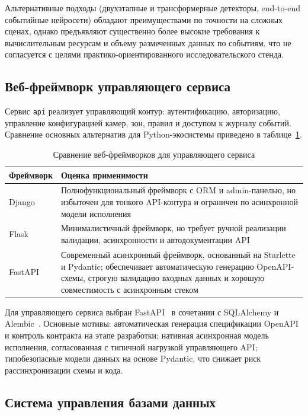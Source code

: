 Альтернативные подходы (двухэтапные и трансформерные детекторы, end-to-end событийные нейросети) обладают преимуществами по точности на сложных сценах, однако предъявляют существенно более высокие требования к вычислительным ресурсам и объему размеченных данных по событиям, что не согласуется с целями практико-ориентированного исследовательского стенда.

\subsection{Веб-фреймворк управляющего сервиса}

Сервис \texttt{api} реализует управляющий контур: аутентификацию, авторизацию, управление конфигурацией камер, зон, правил и доступом к журналу событий. Сравнение основных альтернатив для Python-экосистемы приведено в таблице~\ref{tab:framework_choice}.

\begin{table}[H]
\caption{Сравнение веб-фреймворков для управляющего сервиса}
\label{tab:framework_choice}
\begin{tabularx}{\textwidth}{>{\raggedright\arraybackslash}p{}X}
\toprule
Фреймворк & Оценка применимости \\
\midrule
Django & Полнофункциональный фреймворк с ORM и admin-панелью, но избыточен для тонкого API-контура и ограничен по асинхронной модели исполнения \\
Flask & Минималистичный фреймворк, но требует ручной реализации валидации, асинхронности и автодокументации API \\
FastAPI~\cite{fastapi_docs} & Современный асинхронный фреймворк, основанный на Starlette и Pydantic; обеспечивает автоматическую генерацию OpenAPI-схемы, строгую валидацию входных данных и хорошую совместимость с асинхронным стеком \\
\bottomrule
\end{tabularx}
\end{table}

Для управляющего сервиса выбран FastAPI~\cite{fastapi_docs} в сочетании с SQLAlchemy и Alembic~\cite{sqlalchemy_docs,alembic_docs}. Основные мотивы: автоматическая генерация спецификации OpenAPI и контроль контракта на этапе разработки; нативная асинхронная модель исполнения, согласованная с типичной нагрузкой управляющего API; типобезопасные модели данных на основе Pydantic, что снижает риск рассинхронизации схемы и кода.

\subsection{Система управления базами данных}

